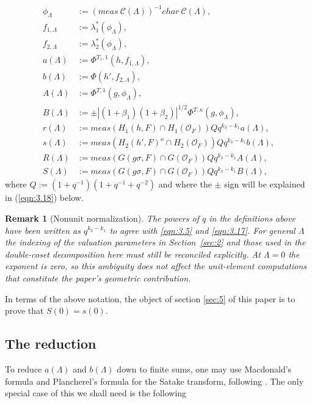 \documentclass[12pt,letterpaper]{amsart}
\numberwithin{equation}{section}
\newtheorem{draftremark}{Remark}
\theoremstyle{definition}
\theoremstyle{plain}
\providecommand{\cal}{\mathcal}
\def\off{{\cal O}_F}
\begin{document}
\[
\begin{split}
\phi_{\Lambda} 
&:= (meas\ \mathcal C(\Lambda ))^{-1}char\ \mathcal C(\Lambda ),\\
f_{1,\Lambda} 
&:= \lambda_1^*(\phi_{\Lambda}),\\
f_{2,\Lambda} 
&:= \lambda_2^*(\phi_{\Lambda}),\\
a(\Lambda ) 
&:=\Phi^{T_1,1}(h,f_{1,\Lambda}),\\
b(\Lambda ) 
&:=\Phi(h',f_{2,\Lambda}),\\
A(\Lambda ) 
&:=\Phi^{T,1}(g,\phi_{\Lambda}),\\
B(\Lambda ) 
&:=\pm
|(1+\beta_1)(1+\beta_2)|^{1/2}\Phi^{T,\kappa}(g,\phi_{\Lambda}),\\
r(\Lambda )
&:= meas(H_{1}(h,F)\cap H_1(\off ))Qq^{k_3-k_1}a(\Lambda ),\\
s(\Lambda )
&:= meas(H_{2}(h',F)^o\cap H_2(\off ))Qq^{k_3-k_1}b(\Lambda ),\\
R(\Lambda )
&:= meas(G(g\sigma,F)\cap G(\off ))Qq^{k_3-k_1}A(\Lambda ),\\
S(\Lambda )
&:= meas(G(g\sigma,F)\cap G(\off ))Qq^{k_3-k_1}B(\Lambda ),
\end{split}
\]
where
$Q:=(1+q^{-1})(1+q^{-1}+q^{-2})$ and where the $\pm$ sign will be
explained in (\ref{eqn:3.18}) below.
\begin{draftremark}[Nonunit normalization]
The powers of $q$ in the definitions above have been written as
$q^{k_3-k_1}$ to agree with \eqref{eqn:3.5} and
\eqref{eqn:3.17}. For general $\Lambda$ the indexing of the
valuation parameters in Section~\ref{sec:2} and those used in the
double-coset decomposition here must still be reconciled explicitly.
At $\Lambda=0$ the exponent is zero, so this ambiguity does not affect
the unit-element computations that constitute the paper's geometric
contribution.
\end{draftremark}
In terms of the above notation, the object of section \ref{sec:5} 
of this paper is to prove that $S(0) = s(0)$.

\subsection{The reduction}
\label{sec:3.2}

To reduce $a(\Lambda )$ and $b(\Lambda )$ down to finite sums, one may
use Macdonald's formula \cite{Ma71} and Plancherel's formula for the Satake
transform, following \cite{LaUn}. The only special case of this we shall
need is the following
\end{document}
